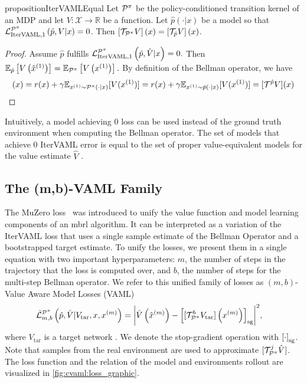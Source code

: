 \begin{restatable}{proposition}{IterVAMLEqual}{\textcite{itervaml}}\label{prop:cvaml:1_1}
    Let $\P^\pi$ be the policy-conditioned transition kernel of an MDP and let $V: \mathcal{X} \rightarrow \mathbb{R}$ be a function.
    Let $\hat{p}(\cdot|x)$ be a model so that ${\mathcal{L}}^{\P^\pi}_{\mathrm{IterVAML}, 1}\left(\hat{p},V|x\right) = 0$.
    Then $\squareb{\mathcal{T}_{\P^\pi} V }(x) = \squareb{\mathcal{T}_{\hat{p}} V }(x)$.
\end{restatable}
\begin{proof}
    Assume $\hat{p}$ fulfills ${\mathcal{L}}^{\P^\pi}_{\mathrm{IterVAML}, 1}\left(\hat{p},\hat{V}|x\right) = 0.$ Then $\mathbb{E}_{\hat{p}}\left[V\left(\hat{x}^{(1)}\right)\right] = \mathbb{E}_{\P^\pi}\left[V\left(x^{(1)}\right)\right].$ By definition of the Bellman operator, we have
    \begin{align}
        [\mathcal{T}^{\P^\pi} V](x) = r(x) + \gamma \mathbb{E}_{x^{(1)}\sim \P^\pi(\cdot|x)}[V(x^{(1)})] = r(x) + \gamma \mathbb{E}_{x^{(1)}\sim \hat{p}(\cdot|x)}[V(x^{(1)})] = [\mathcal{T}^{\hat{p}}V](x)
    \end{align}
\end{proof}

Intuitively, a model achieving $0$ loss can be used instead of the ground truth environment when computing the Bellman operator.
The set of models that achieve $0$ IterVAML error is equal to the set of proper value-equivalent models for the value estimate $\hat{V}$ \cite{grimm2021proper}.

\subsection{The (m,b)-VAML Family}
The MuZero loss~\parencite{schrittwieser2020mastering} was introduced to unify the value function and model learning components of an \ac{mbrl} algorithm.
It can be interpreted as a variation of the IterVAML loss that uses a single sample estimate of the Bellman Operator and a bootstrapped target estimate. 
To unify the losses, we present them in a single equation with two important hyperparameters: $m$, the number of steps in the trajectory that the loss is computed over, and $b$, the number of steps for the multi-step Bellman operator.
We refer to this unified family of losses as $(m,b)$-Value Aware Model Losses (VAML)
\begin{align}
    & \hat{\mathcal{L}}^{\P^\pi}_{m,b}\left(\hat{p},\hat{V}|V_\mathrm{tar},x, x^{(m)}\right) = \biggl|\hat{V}\roundb{\hat{x}^{(m)}} - 
    \squareb{[\mathcal{T}_{\P^\pi}^b V_\mathrm{tar}]\roundb{x^{(m)}}}_\mathrm{sg}\biggr|^2, \label{eq:cvaml:dal_loss}
\end{align}
where $V_\mathrm{tar}$ is a target network \parencite{mnih2013playing}.
We denote the stop-gradient operation with $\squareb{\cdot}_\mathrm{sg}$.
Note that samples from the real environment are used to approximate $[\mathcal{T}_{\P^\pi}^j \hat{V}]$.
The loss function and the relation of the model and environments rollout are visualized in \autoref{fig:cvaml:loss_graphic}.

